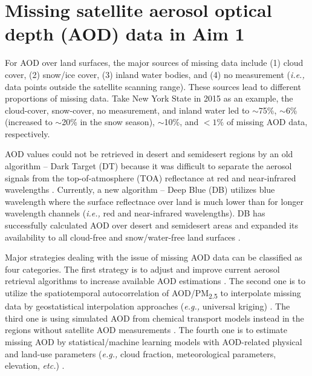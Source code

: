 \documentclass[11pt]{article}
\newcommand{\tsub}{\textsubscript}
\begin{document}
\section{Missing satellite aerosol optical depth (AOD) data in Aim 1}
\begin{enumerate*}[{[a)]}]
    \item For AOD over land surfaces, the major sources of missing data include (1) cloud cover, (2) snow/ice cover, (3) inland water bodies, and (4) no measurement (\textit{i.e.,} data points outside the satellite scanning range). These sources lead to different proportions of missing data. Take New York State in 2015 as an example, the cloud-cover, snow-cover, no measurement, and inland water led to $\sim$75\%, $\sim$6\% (increased to $\sim$20\% in the snow season), $\sim$10\%, and $< 1\%$ of missing AOD data, respectively. 
    
    AOD values could not be retrieved in desert and semidesert regions by an old algorithm -- Dark Target (DT) \citep{kaufman1997modis, levy2007second} because it was difficult to separate the aerosol signals from the top-of-atmosphere (TOA) reflectance at red and near-infrared wavelengths \citep{hsu2013enhanced}. Currently, a new algorithm -- Deep Blue (DB) \citep{hsu2004aerosol} utilizes blue wavelength where the surface reflectnace over land is much lower than for longer wavelength channels (\textit{i.e.,} red and near-infrared wavelengths). DB has successfully calculated AOD over desert and semidesert areas and expanded its availability to all cloud-free and snow/water-free land surfaces \citep{hsu2013enhanced}. 
    
    Major strategies dealing with the issue of missing AOD data can be classified as four categories. The first strategy is to adjust and improve current aerosol retrieval algorithms to increase available AOD estimations \citep{van2011satellite}. The second one is to utilize the spatiotemporal autocorrelation of AOD/PM\tsub{2.5} to interpolate missing data by geostatistical interpolation approaches (\textit{e.g.,} universal kriging) \citep{kloog2011assessing, kloog2012incorporating}. The third one is using simulated AOD from chemical transport models instead in the regions without satellite AOD measurements \citep{hu2017estimating}. The fourth one is to estimate missing AOD by statistical/machine learning models with AOD-related physical and land-use parameters (\textit{e.g.,} cloud fraction, meteorological parameters, elevation, \textit{etc.}) \citep{xiao2017full}.
    

\end{enumerate*}
\end{document}
